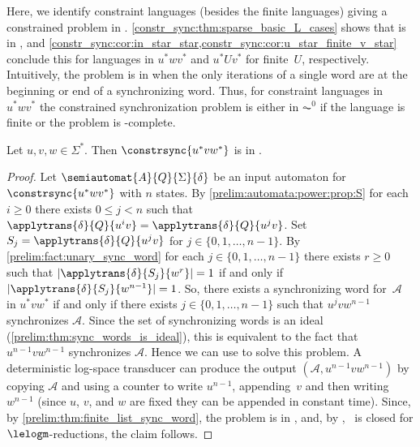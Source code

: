 
Here, we identify constraint languages (besides the finite languages) giving a constrained problem in \LOGSPACE. 
\cref{constr_sync:thm:sparse_basic_L_cases}
shows that 
is in \LOGSPACE, and \cref{constr_sync:cor:in_star_star,constr_sync:cor:u_star_finite_v_star}
conclude this for languages in $u^*wv^*$ and $u^*Uv^*$ for finite~$U$, respectively.
Intuitively, the problem is in \LOGSPACE when the only iterations of a single word are at the beginning
or end of a synchronizing word. Thus, for constraint languages in $u^*wv^*$
the constrained synchronization problem is either in $\AC^0$ if the language is finite
or the problem is \LOGSPACE-complete.

\begin{theorem}
	\label{constr_sync:thm:sparse_basic_L_cases}
	Let $u,v,w \in \Sigma^*$.	
	Then $\constrsync{u^*vw^*}$	is in \LOGSPACE.
\end{theorem}
\begin{proof}
	Let $\semiautomat{A}{Q}{\Sigma}{\delta}$ be 
	an input automaton for $\constrsync{u^*wv^*}$ with $n$ states.
	By \cref{prelim:automata:power:prop:S} 
	for each $i \ge 0$ there exists $0 \le j < n$ such that 
	$\applytrans{\delta}{Q}{u^iv} = \applytrans{\delta}{Q}{u^jv}$. 
	Set $S_j = \applytrans{\delta}{Q}{u^jv}$ for $j \in \{0,1,\ldots,n-1\}$.
	By \cref{prelim:fact:unary_sync_word} for each $j \in \{0,1,\ldots,n-1\}$
	there exists $r \ge 0$ such that $|\applytrans{\delta}{S_j}{w^r}| = 1$
	if and only if $|\applytrans{\delta}{S_j}{w^{n-1}}| = 1$. 
	So, there exists a synchronizing word for~$\mathcal A$
	in $u^* v w^*$ if and only if there
	exists $j \in \{0, 1,\ldots,n-1\}$
	such that $u^j v w^{n-1}$
	synchronizes $\mathcal A$.
	Since the set of synchronizing words is an ideal (\cref{prelim:thm:sync_words_is_ideal}),
	this is equivalent to the fact that $u^{n-1} v w^{n-1}$
	synchronizes $\mathcal A$.  Hence we can use  \DFASW to solve this problem.
	A deterministic log-space transducer 
	can produce the output 
	$ (\mathcal A, u^{n-1}vw^{n-1})
	$
	by copying $\mathcal A$ and using a counter to write $u^{n-1}$, appending~$v$ and then writing~$w^{n-1}$ 
	(since $u$, $v$, and $w$ are fixed they can be appended in constant time).
	Since, by \cref{prelim:thm:finite_list_sync_word}, the problem \DFASW is in \LOGSPACE,
	and, by ,
	\LOGSPACE\ is closed for $\lelogm$-reductions, the claim follows.
\end{proof}

